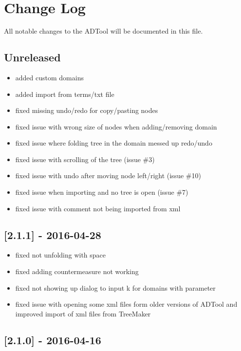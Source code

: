 \section{Change Log}\label{change-log}

All notable changes to the ADTool will be documented in this file.

\subsection{Unreleased}\label{unreleased}

\begin{itemize}
\tightlist
\item
  added custom domains
\item
  added import from terms/txt file
\item
  fixed missing undo/redo for copy/pasting nodes
\item
  fixed issue with wrong size of nodes when adding/removing domain
\item
  fixed issue where folding tree in the domain messed up redo/undo
\item
  fixed issue with scrolling of the tree (issue \#3)
\item
  fixed issue with undo after moving node left/right (issue \#10)
\item
  fixed issue when importing and no tree is open (issue \#7)
\item
  fixed issue with comment not being imported from xml
\end{itemize}

\subsection{{[}2.1.1{]} - 2016-04-28}\label{section}

\begin{itemize}
\tightlist
\item
  fixed not unfolding with space
\item
  fixed adding countermeasure not working
\item
  fixed not showing up dialog to input k for domains with parameter
\item
  fixed issue with opening some xml files form older versions of ADTool
  and improved import of xml files from TreeMaker
\end{itemize}

\subsection{{[}2.1.0{]} - 2016-04-16}\label{section-1}

